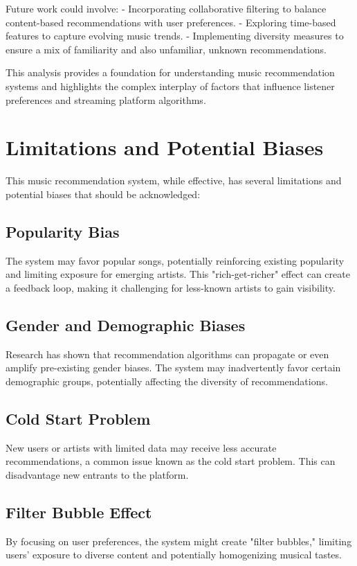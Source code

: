 \documentclass[runningheads]{llncs}
\begin{document}
Future work could involve:
- Incorporating collaborative filtering to balance content-based recommendations with user preferences.
- Exploring time-based features to capture evolving music trends.
- Implementing diversity measures to ensure a mix of familiarity and also unfamiliar, unknown recommendations.

This analysis provides a foundation for understanding music recommendation systems and highlights the complex interplay of factors that influence listener preferences and streaming platform algorithms.

\section{Limitations and Potential Biases}

This music recommendation system, while effective, has several limitations and potential biases that should be acknowledged:

\subsection{Popularity Bias}
The system may favor popular songs, potentially reinforcing existing popularity and limiting exposure for emerging artists. This "rich-get-richer" effect can create a feedback loop, making it challenging for less-known artists to gain visibility.

\subsection{Gender and Demographic Biases}
Research has shown that recommendation algorithms can propagate or even amplify pre-existing gender biases. The system may inadvertently favor certain demographic groups, potentially affecting the diversity of recommendations.

\subsection{Cold Start Problem}
New users or artists with limited data may receive less accurate recommendations, a common issue known as the cold start problem. This can disadvantage new entrants to the platform.

\subsection{Filter Bubble Effect}
By focusing on user preferences, the system might create "filter bubbles," limiting users' exposure to diverse content and potentially homogenizing musical tastes.
\end{document}
